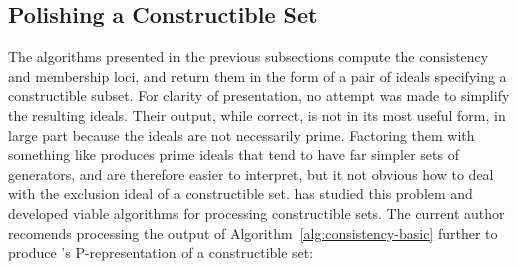 \documentclass{article}
\theoremstyle{definition}
\theoremstyle{plain}
\begin{document}
\vfill\eject
\subsection{Polishing a Constructible Set}
\label{sec:constructible-set}

The algorithms presented in the previous subsections compute the consistency
and membership loci, and return them in the form of a pair of ideals
specifying a constructible subset.  For clarity of presentation,
no attempt was made to simplify the resulting ideals.
Their output, while correct, is not in its most useful form, in large part because
the ideals are not necessarily prime.  Factoring them with something like \cite{GTZ}
produces prime ideals that tend to have far simpler sets of generators,
and are therefore easier to interpret, but it not obvious how to deal
with the exclusion ideal of a constructible set.  \cite{BrunatMontes}
has studied this problem and developed viable algorithms for processing
constructible sets.
The current author recomends
processing the output of Algorithm~\ref{alg:consistency-basic}
further to produce \cite{BrunatMontes}'s P-representation of
a constructible set:
\end{document}
